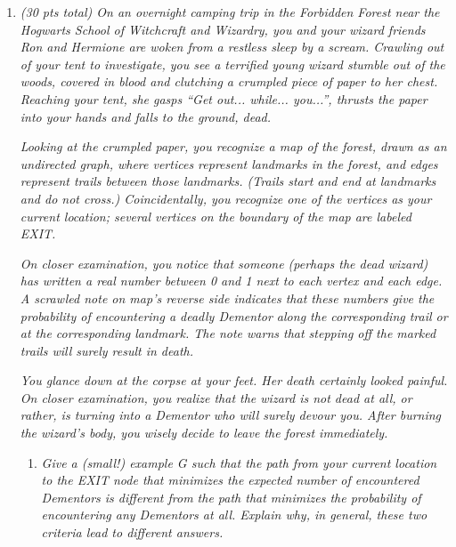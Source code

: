 \documentclass[12pt]{article}
\begin{document}
\renewcommand{\headrulewidth}{0.5pt}
\vspace{-3mm}
\begin{enumerate}

	
     \item \textit{(30 pts total) On an overnight camping trip in the Forbidden Forest near the Hogwarts School of Witchcraft and Wizardry, you and your 
wizard friends Ron and Hermione are woken from a restless sleep by a scream. Crawling out of your tent to investigate, you see a terrified young wizard 
stumble out of the woods, covered in blood and clutching a crumpled piece of paper to her chest. Reaching your tent, she gasps “Get out... while... you...”, 
thrusts the paper into your hands and falls to the ground, dead.}
     
     \textit{Looking at the crumpled paper, you recognize a map of the forest, drawn as an undirected graph, where vertices represent landmarks in the forest, 
and edges represent trails between those landmarks. (Trails start and end at landmarks and do not cross.) Coincidentally, you recognize one of the vertices as 
your current location; several vertices on the boundary of the map are labeled EXIT.}
     
     \textit{On closer examination, you notice that someone (perhaps the dead wizard) has written a real number between 0 and 1 next to each vertex and each 
edge. A scrawled note on map's reverse side indicates that these numbers give the probability of encountering a deadly Dementor along the corresponding trail 
or at the corresponding landmark. The note warns that stepping off the marked trails will surely result in death.}
     
     \textit{You glance down at the corpse at your feet. Her death certainly looked painful. On closer examination, you realize that the wizard is not dead at 
all, or rather, is turning into a Dementor who will surely devour you. After burning the wizard's body, you wisely decide to leave the forest immediately.}

    \begin{enumerate}
        \item \textit{Give a (small!) example G such that the path from your current location to the EXIT node that minimizes the expected number of 
encountered Dementors is different from the path that minimizes the probability of encountering any Dementors at all. Explain why, in general, these two 
criteria lead to different answers.}\\
        

\end{enumerate}
\end{enumerate}
\end{document}
